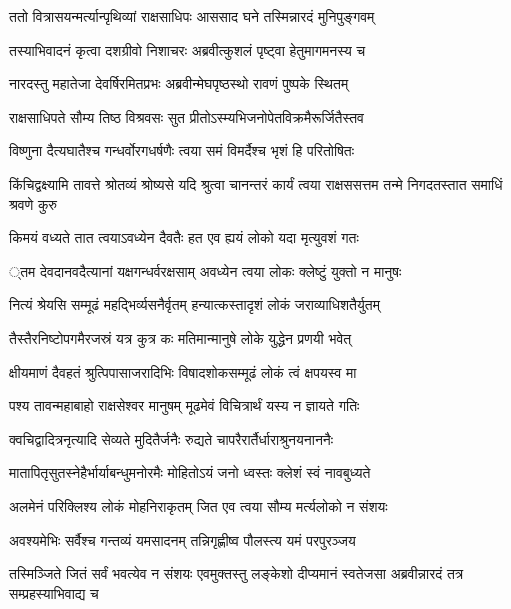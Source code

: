 
\twolineshloka
{ततो वित्रासयन्मर्त्यान्पृथिव्यां राक्षसाधिपः}
{आससाद घने तस्मिन्नारदं मुनिपुङ्गवम्} %

\twolineshloka
{तस्याभिवादनं कृत्वा दशग्रीवो निशाचरः}
{अब्रवीत्कुशलं पृष्ट्वा हेतुमागमनस्य च} %

\twolineshloka
{नारदस्तु महातेजा देवर्षिरमितप्रभः}
{अब्रवीन्मेघपृष्ठस्थो रावणं पुष्पके स्थितम्} %

\twolineshloka
{राक्षसाधिपते सौम्य तिष्ठ विश्रवसः सुत}
{प्रीतोऽस्म्यभिजनोपेतविक्रमैरूर्जितैस्तव} %

\twolineshloka
{विष्णुना दैत्यघातैश्च गन्धर्वोरगधर्षणैः}
{त्वया समं विमर्दैश्च भृशं हि परितोषितः} %

\threelineshloka
{किंचिद्वक्ष्यामि तावत्ते श्रोतव्यं श्रोष्यसे यदि}
{श्रुत्वा चानन्तरं कार्यं त्वया राक्षससत्तम}
{तन्मे निगदतस्तात समाधिं श्रवणे कुरु} %

\twolineshloka
{किमयं वध्यते तात त्वयाऽवध्येन दैवतैः}
{हत एव ह्ययं लोको यदा मृत्युवशं गतः} %

\threelineshloka
{्तम}
{देवदानवदैत्यानां यक्षगन्धर्वरक्षसाम्}
{अवध्येन त्वया लोकः क्लेष्टुं युक्तो न मानुषः} %

\twolineshloka
{नित्यं श्रेयसि सम्मूढं महद्भिर्व्यसनैर्वृतम्}
{हन्यात्कस्तादृशं लोकं जराव्याधिशतैर्युतम्} %

\twolineshloka
{तैस्तैरनिष्टोपगमैरजस्रं यत्र कुत्र कः}
{मतिमान्मानुषे लोके युद्धेन प्रणयी भवेत्} %

\twolineshloka
{क्षीयमाणं दैवहतं श्रुत्पिपासाजरादिभिः}
{विषादशोकसम्मूढं लोकं त्वं क्षपयस्व मा} %

\twolineshloka
{पश्य तावन्महाबाहो राक्षसेश्वर मानुषम्}
{मूढमेवं विचित्रार्थं यस्य न ज्ञायते गतिः} %

\twolineshloka
{क्वचिद्वादित्रनृत्यादि सेव्यते मुदितैर्जनैः}
{रुद्यते चापरैरार्तैर्धाराश्रुनयनाननैः} %

\twolineshloka
{मातापितृसुतस्नेहैर्भार्याबन्धुमनोरमैः}
{मोहितोऽयं जनो ध्वस्तः क्लेशं स्वं नावबुध्यते} %

\twolineshloka
{अलमेनं परिक्लिश्य लोकं मोहनिराकृतम्}
{जित एव त्वया सौम्य मर्त्यलोको न संशयः} %

\twolineshloka
{अवश्यमेभिः सर्वैश्च गन्तव्यं यमसादनम्}
{तन्निगृह्णीष्व पौलस्त्य यमं परपुरञ्जय} %

\threelineshloka
{तस्मिञ्जिते जितं सर्वं भवत्येव न संशयः}
{एवमुक्तस्तु लङ्केशो दीप्यमानं स्वतेजसा}
{अब्रवीन्नारदं तत्र सम्प्रहस्याभिवाद्य च} %

